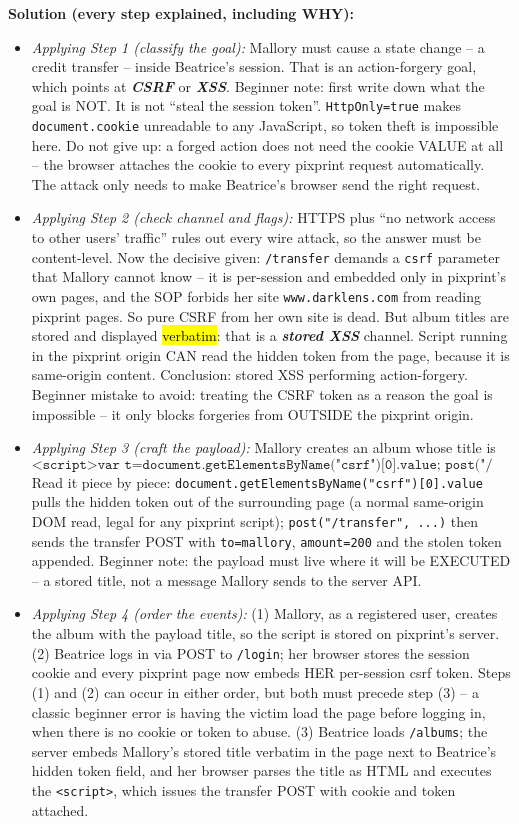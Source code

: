 \documentclass[12pt, a4paper]{article}
\newcommand{\term}[1]{\textbf{\textit{#1}}}        %
\newcommand{\imp}[1]{\hl{#1}}                       %
\begin{document}
\textbf{Solution (every step explained, including WHY):}
\begin{itemize}
    \item \textit{Applying Step 1 (classify the goal):} Mallory must cause a state change -- a credit transfer -- inside Beatrice's session. That is an action-forgery goal, which points at \term{CSRF} or \term{XSS}. Beginner note: first write down what the goal is NOT. It is not ``steal the session token''. \texttt{HttpOnly=true} makes \texttt{document.cookie} unreadable to any JavaScript, so token theft is impossible here. Do not give up: a forged action does not need the cookie VALUE at all -- the browser attaches the cookie to every pixprint request automatically. The attack only needs to make Beatrice's browser send the right request.
    \item \textit{Applying Step 2 (check channel and flags):} HTTPS plus ``no network access to other users' traffic'' rules out every wire attack, so the answer must be content-level. Now the decisive given: \texttt{/transfer} demands a \texttt{csrf} parameter that Mallory cannot know -- it is per-session and embedded only in pixprint's own pages, and the SOP forbids her site \texttt{www.darklens.com} from reading pixprint pages. So pure CSRF from her own site is dead. But album titles are stored and displayed \imp{verbatim}: that is a \term{stored XSS} channel. Script running in the pixprint origin CAN read the hidden token from the page, because it is same-origin content. Conclusion: stored XSS performing action-forgery. Beginner mistake to avoid: treating the CSRF token as a reason the goal is impossible -- it only blocks forgeries from OUTSIDE the pixprint origin.
    \item \textit{Applying Step 3 (craft the payload):} Mallory creates an album whose title is
\[ \texttt{<script>var t=document.getElementsByName("csrf")[0].value; post("/transfer", "to=mallory,amount=200,csrf="+t)</script>} \]
Read it piece by piece: \texttt{document.getElementsByName("csrf")[0].value} pulls the hidden token out of the surrounding page (a normal same-origin DOM read, legal for any pixprint script); \texttt{post("/transfer", ...)} then sends the transfer POST with \texttt{to=mallory}, \texttt{amount=200} and the stolen token appended. Beginner note: the payload must live where it will be EXECUTED -- a stored title, not a message Mallory sends to the server API.
    \item \textit{Applying Step 4 (order the events):} (1) Mallory, as a registered user, creates the album with the payload title, so the script is stored on pixprint's server. (2) Beatrice logs in via POST to \texttt{/login}; her browser stores the session cookie and every pixprint page now embeds HER per-session csrf token. Steps (1) and (2) can occur in either order, but both must precede step (3) -- a classic beginner error is having the victim load the page before logging in, when there is no cookie or token to abuse. (3) Beatrice loads \texttt{/albums}; the server embeds Mallory's stored title verbatim in the page next to Beatrice's hidden token field, and her browser parses the title as HTML and executes the \texttt{<script>}, which issues the transfer POST with cookie and token attached.

\end{itemize}
\end{document}
